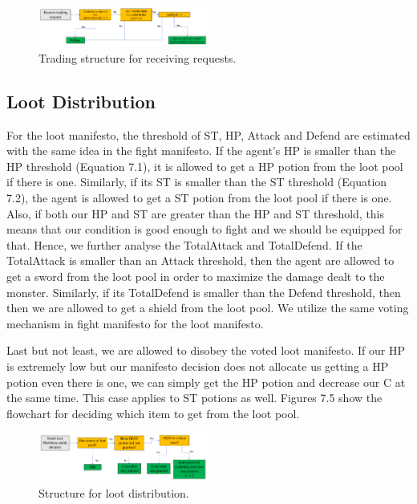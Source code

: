 \begin{figure}
    \centering
    \includegraphics[width=0.5\textwidth]{007_team_4_agent_design/figures/3_trading_receive_2.png}
    \caption{Trading structure for receiving requests.}
    \label{fig:proj_struct}
\end{figure}

\subsection{Loot Distribution}

\par For the loot manifesto, the threshold of ST, HP, Attack and Defend are estimated with the same idea in the fight manifesto. If the agent's HP is smaller than the HP threshold (Equation 7.1), it is allowed to get a HP potion from the loot pool if there is one. Similarly, if its ST is smaller than the ST threshold (Equation 7.2), the agent is allowed to get a ST potion from the loot pool if there is one. Also, if both our HP and ST are greater than the HP and ST threshold, this means that our condition is good enough to fight and we should be equipped for that. Hence, we further analyse the TotalAttack and TotalDefend. If the TotalAttack is smaller than an Attack threshold, then the agent are allowed to get a sword from the loot pool in order to maximize the damage dealt to the monster. Similarly, if its TotalDefend is smaller than the Defend threshold, then then we are allowed to get a shield from the loot pool. We utilize the same voting mechanism in fight manifesto for the loot manifesto.

\par Last but not least, we are allowed to disobey the voted loot manifesto. If our HP is extremely low but our manifesto decision does not allocate us  getting a HP potion even there is one, we can simply get the HP potion and decrease our C at the same time. This case applies to ST potions as well. Figures 7.5 show the flowchart for deciding which item to get from the loot pool.

\begin{figure}
    \centering
    \includegraphics[width=0.5\textwidth]{007_team_4_agent_design/figures/5_loot.png}
    \caption{Structure for loot distribution.}
    \label{fig:proj_struct}
\end{figure}

